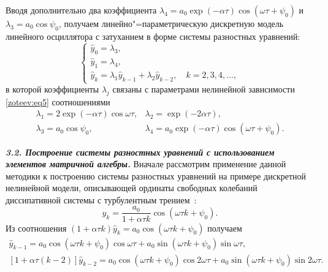 Вводя дополнительно два коэффициента $\lambda_4=a_0\exp(-\alpha\tau)\cos(\omega\tau+\psi_0)$ и~$\lambda_3=a_0\cos\psi_0$, получаем линейно"=параметрическую дискретную модель линейного осциллятора с затуханием в форме системы разностных уравнений:
\begin{equation}
\left\{
\begin{array}{l}
{\hat{y}_0=\lambda_3,} \\
{\hat{y}_1=\lambda_4,} \\
{\hat{y}_k=\lambda_1\hat{y}_{k-1}+\lambda_2\hat{y}_{k-2}, \quad k=2,3,4,\dots,}
\label{zoteev:eq6}
\end{array}
\right.
\end{equation}
в которой коэффициенты $\lambda_j$ связаны с параметрами нелинейной зависимости  \eqref{zoteev:eq5}  соотношениями
\begin{equation}
\left.
\begin{array}{ll}
\lambda_1=2\exp(-\alpha\tau)\cos\omega\tau, & \lambda_2=\exp(-2\alpha\tau), \\
\lambda_3=a_0\cos\psi_0, & \lambda_4=a_0\exp(-\alpha\tau)\cos(\omega\tau+\psi_0). 
\label{zoteev:eq7}
\end{array}
\right.
\end{equation}


\smallskip

{\bf \itshape 3.2. Построение системы разностных уравнений с использованием элементов матричной алгебры.}
Вначале рассмотрим применение данной методики к построению системы разностных уравнений на примере дискретной нелинейной модели, описывающей ординаты свободных колебаний диссипативной системы с турбулентным трением~\cite{zot:11,zot:13}:
\begin{equation}
\hat{y}_k=\dfrac{a_0}{1+\alpha\tau k}\cos(\omega\tau k+\psi_0).
\label{zoteev:eq8}
\end{equation}
Из соотношения $(1+\alpha\tau k)\hat{y}_k=a_0\cos(\omega\tau k+\psi_0)$ получаем
\begin{gather}
[1+\alpha\tau(k-1)]\hat{y}_{k-1}=a_0\cos(\omega\tau k+\psi_0)\cos\omega\tau+a_0\sin(\omega\tau k+\psi_0)\sin\omega\tau,~~~
\\
[1+\alpha\tau(k-2)]\hat{y}_{k-2}=a_0\cos(\omega\tau k+\psi_0)\cos 2 \omega\tau+a_0\sin(\omega\tau k+\psi_0)\sin 2 \omega\tau.
\end{gather}

